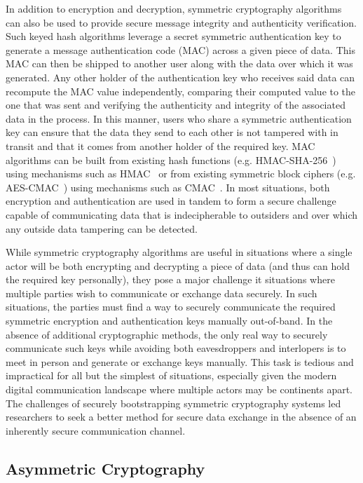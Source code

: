 In addition to encryption and decryption, symmetric cryptography
algorithms can also be used to provide secure message integrity and
authenticity verification. Such keyed hash algorithms leverage a
secret symmetric authentication key to generate a message
authentication code (MAC) across a given piece of data. This MAC can
then be shipped to another user along with the data over which it was
generated. Any other holder of the authentication key who receives
said data can recompute the MAC value independently, comparing their
computed value to the one that was sent and verifying the authenticity
and integrity of the associated data in the process. In this manner,
users who share a symmetric authentication key can ensure that the
data they send to each other is not tampered with in transit and that
it comes from another holder of the required key. MAC algorithms can
be built from existing hash functions
(e.g. HMAC-SHA-256~\cite{kelly2007}) using mechanisms such as
HMAC~\cite{krawczyk1997} or from existing symmetric block ciphers
(e.g. AES-CMAC~\cite{song2006}) using mechanisms such as
CMAC~\cite{Black2005, dworkin2005}. In most situations, both
encryption and authentication are used in tandem to form a secure
challenge capable of communicating data that is indecipherable to
outsiders and over which any outside data tampering can be detected.

While symmetric cryptography algorithms are useful in situations where
a single actor will be both encrypting and decrypting a piece of data
(and thus can hold the required key personally), they pose a major
challenge it situations where multiple parties wish to communicate or
exchange data securely. In such situations, the parties must find a
way to securely communicate the required symmetric encryption and
authentication keys manually out-of-band. In the absence of additional
cryptographic methods, the only real way to securely communicate such
keys while avoiding both eavesdroppers and interlopers is to meet in
person and generate or exchange keys manually. This task is tedious
and impractical for all but the simplest of situations, especially
given the modern digital communication landscape where multiple actors
may be continents apart. The challenges of securely bootstrapping
symmetric cryptography systems led researchers to seek a better method
for secure data exchange in the absence of an inherently secure
communication channel.

\subsection{Asymmetric Cryptography}

